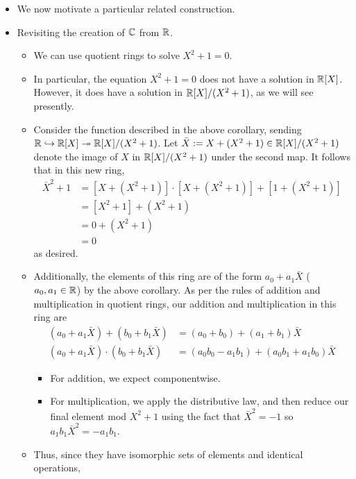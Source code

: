\documentclass[../notes.tex]{subfiles}
\begin{document}
\begin{itemize}
\begin{itemize}
    \end{itemize}
    \item We now motivate a particular related construction.
    \item Revisiting the creation of $\mathbb{C}$ from $\mathbb{R}$.
    \begin{itemize}
        \item We can use quotient rings to solve $X^2+1=0$.
        \item In particular, the equation $X^2+1=0$ does not have a solution in $\mathbb{R}[X]$. However, it does have a solution in $\mathbb{R}[X]/(X^2+1)$, as we will see presently.
        \item Consider the function described in the above corollary, sending $\mathbb{R}\hookrightarrow\mathbb{R}[X]\twoheadrightarrow\mathbb{R}[X]/(X^2+1)$. Let $\bar{X}:=X+(X^2+1)\in\mathbb{R}[X]/(X^2+1)$ denote the image of $X$ in $\mathbb{R}[X]/(X^2+1)$ under the second map. It follows that in this new ring,
        \begin{align*}
            \bar{X}^2+1 &= [X+(X^2+1)]\cdot[X+(X^2+1)]+[1+(X^2+1)]\\
            &= [X^2+1]+(X^2+1)\\
            &= 0+(X^2+1)\\
            &= 0
        \end{align*}
        as desired.
        \item Additionally, the elements of this ring are of the form $a_0+a_1\bar{X}$ ($a_0,a_1\in\mathbb{R}$) by the above corollary. As per the rules of addition and multiplication in quotient rings, our addition and multiplication in this ring are
        \begin{align*}
            (a_0+a_1\bar{X})+(b_0+b_1\bar{X}) &= (a_0+b_0)+(a_1+b_1)\bar{X}\\
            (a_0+a_1\bar{X})\cdot(b_0+b_1\bar{X}) &= (a_0b_0-a_1b_1)+(a_0b_1+a_1b_0)\bar{X}
        \end{align*}
        \begin{itemize}
            \item For addition, we expect componentwise.
            \item For multiplication, we apply the distributive law, and then reduce our final element mod $X^2+1$ using the fact that $\bar{X}^2=-1$ so $a_1b_1\bar{X}^2=-a_1b_1$.
        \end{itemize}
        \item Thus, since they have isomorphic sets of elements and identical operations,
        \begin{equation*}

\end{equation*}
\end{itemize}
\end{itemize}
\end{document}
